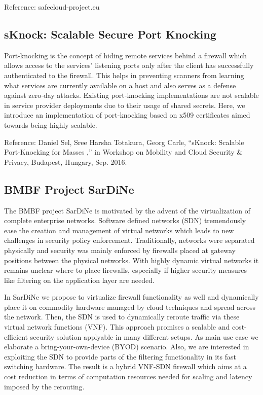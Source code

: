 Reference: 
safecloud-project.eu

\subsection{sKnock: Scalable Secure Port Knocking}

Port-knocking  is  the  concept  of  hiding  remote  services behind   a
  firewall   which   allows   access   to   the   services’ listening
ports only after the client has successfully authenticated to  the
firewall.  This  helps  in  preventing  scanners  from  learning what
services  are  currently  available  on  a  host  and  also  serves as
a  defense  against  zero-day  attacks.  Existing  port-knocking
implementations are not scalable in service provider deployments due to
their usage of shared secrets. Here, we introduce an  implementation  of
port-knocking  based  on  x509  certificates aimed  towards  being
highly  scalable.

Reference:
Daniel Sel, Sree Harsha Totakura, Georg Carle, “sKnock: Scalable
Port-Knocking for Masses ,” in Workshop on Mobility and Cloud Security \&
Privacy, Budapest, Hungary, Sep. 2016.

\subsection{BMBF Project SarDiNe}

The BMBF project SarDiNe is motivated by the advent of the virtualization of
complete enterprise networks. Software defined networks (SDN) tremendously ease
the creation and management of virtual networks which leads to new challenges
in security policy enforcement. Traditionally, networks were separated
physically and security was mainly enforced by firewalls placed at gateway
positions between the physical networks. With highly dynamic virtual networks
it remains unclear where to place firewalls, especially if higher security
measures like filtering on the application layer are needed.

In SarDiNe we propose to virtualize firewall functionality as well and
dynamically place it on commodity hardware managed by cloud techniques and
spread across the network. Then, the SDN is used to dynamically reroute traffic
via these virtual network functions (VNF). This approach promises a scalable
and cost-efficient security solution applyable in many different setups. As main
use case we elaborate a bring-your-own-device (BYOD) scenario. Also, we are
interested in exploiting the SDN to provide parts of the filtering
functionality in its fast switching hardware. The result is a hybrid VNF-SDN
firewall which aims at a cost reduction in terms of computation resources
needed for scaling and latency imposed by the rerouting.

